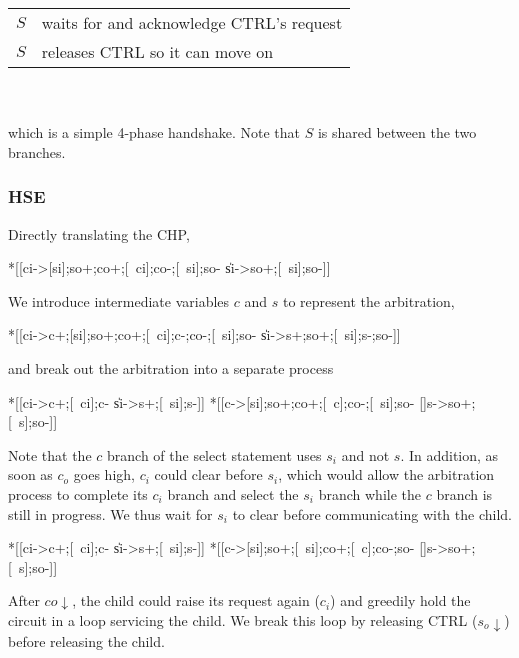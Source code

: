 \documentclass[aer.tex]{subfiles}
\begin{document}
\begin{tabular}[]{rl}
  $S$ & waits for and acknowledge CTRL's request \\
  $S$ & releases CTRL so it can move on \\
\end{tabular} \\ \\

\noindent which is a simple 4-phase handshake. Note that $S$ is shared between the two branches.

\subsubsection{HSE}

\noindent Directly translating the CHP,

\begin{hse}
*[[ci->[si];so+;co+;[~ci];co-;[~si];so-
  \|si->so+;[~si];so-]]
\end{hse}

\noindent We introduce intermediate variables $c$ and $s$ to represent the arbitration,

\begin{hse}
*[[ci->c+;[si];so+;co+;[~ci];c-;co-;[~si];so-
  \|si->s+;so+;[~si];s-;so-]]
\end{hse}

\noindent and break out the arbitration into a separate process

\begin{hse}
*[[ci->c+;[~ci];c-
  \|si->s+;[~si];s-]]
*[[c->[si];so+;co+;[~c];co-;[~si];so-
  []s->so+;[~s];so-]]
\end{hse}

\noindent Note that the $c$ branch of the select statement uses $s_i$ and not $s$. In addition, as soon as $c_o$ goes high, $c_i$ could clear before $s_i$, which would allow the arbitration process to complete its $c_i$ branch and select the $s_i$ branch while the $c$ branch is still in progress. We thus wait for $s_i$ to clear before communicating with the child.

\begin{hse}
*[[ci->c+;[~ci];c-
  \|si->s+;[~si];s-]]
*[[c->[si];so+;[~si];co+;[~c];co-;so-
  []s->so+;[~s];so-]]
\end{hse}

\noindent After $co\!\downarrow$, the child could raise its request again ($c_i$) and greedily hold the circuit in a loop servicing the child. We break this loop by releasing CTRL ($s_o\!\downarrow$) before releasing the child.
\end{document}
